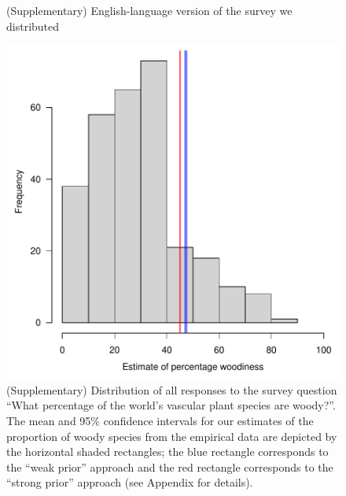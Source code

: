 \documentclass[12pt]{article}
\begin{document}
\begin{figure}[p]
  \centering
  
  \caption{(Supplementary) English-language version of the survey we
    distributed}
  \label{fig:survey-text}
\end{figure}

\begin{figure}[p]
  \centering
  \includegraphics{figs/survey-distribution}
  \caption{(Supplementary) Distribution of all responses to the survey
    question ``What percentage of the world's vascular plant species
    are woody?''.
    The mean and 95\% confidence intervals for our estimates of the
    proportion of woody species from the empirical data are depicted
    by the horizontal shaded rectangles; the blue rectangle corresponds
    to the ``weak prior'' approach and the red rectangle corresponds
    to the ``strong prior'' approach (see Appendix for details).  }

  \label{fig:survey-distribution}
\end{figure}
\end{document}
